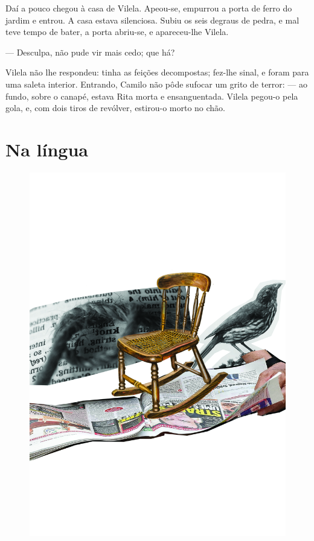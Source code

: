 Daí a pouco chegou à casa de Vilela. Apeou-se, empurrou a porta de ferro
do jardim e entrou. A casa estava silenciosa. Subiu os seis degraus de
pedra, e mal teve tempo de bater, a porta abriu-se, e apareceu-lhe
Vilela.

--- Desculpa, não pude vir mais cedo; que há?

Vilela não lhe respondeu: tinha as feições decompostas; fez-lhe sinal, e
foram para uma saleta interior. Entrando, Camilo não pôde sufocar um
grito de terror: --- ao fundo, sobre o canapé, estava Rita morta e
ensanguentada. Vilela pegou-o pela gola, e, com dois tiros de revólver,
estirou-o morto no chão.

\part{Na língua}

\pagebreak
\thispagestyle{empty}
\begin{figure}
\vspace*{-.5cm}
\hspace*{-2.3cm}\includegraphics[width=140mm]{../ilustracoes/14_PLEBISCITO.jpg}
\end{figure}
\pagebreak

